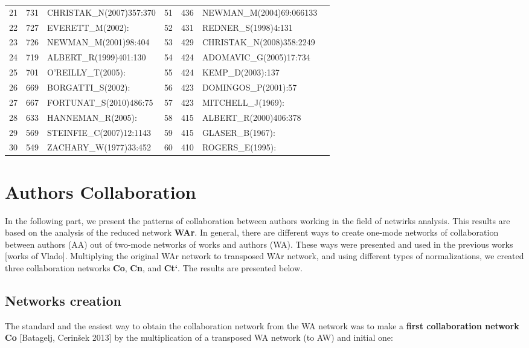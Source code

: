 \documentclass[11pt]{article} %
\begin{document}
\begin{table}
\begin{tabular}{c|c|l||c|c|l|l}
21&   	731&   	CHRISTAK\_N(2007)357:370&   	51&   	436&   	NEWMAN\_M(2004)69:066133\\
22&   	727&   	EVERETT\_M(2002):&   	52&   	431&   	REDNER\_S(1998)4:131\\
23&   	726&   	NEWMAN\_M(2001)98:404&   	53&   	429&   	CHRISTAK\_N(2008)358:2249\\
24&   	719&   	ALBERT\_R(1999)401:130&   	54&   	424&   	ADOMAVIC\_G(2005)17:734\\
25&   	701&   	O'REILLY\_T(2005):&   	55&   	424&   	KEMP\_D(2003):137\\
26&   	669&   	BORGATTI\_S(2002):&   	56&   	423&   	DOMINGOS\_P(2001):57\\
27&   	667&   	FORTUNAT\_S(2010)486:75&   	57&   	423&   	MITCHELL\_J(1969):\\
28&   	633&   	HANNEMAN\_R(2005):&   	58&   	415&   	ALBERT\_R(2000)406:378\\
29&   	569&   	STEINFIE\_C(2007)12:1143&   	59&   	415&   	GLASER\_B(1967):\\
30&   	549&   	ZACHARY\_W(1977)33:452&   	60&   	410&   	ROGERS\_E(1995):\\ \hline
\end{tabular}
\end{table}

\section{Authors Collaboration}  

In the following part, we present the patterns of collaboration between authors working in the field of netwirks analysis. This results are based on the analysis of the reduced network \textbf{WAr}. In general, there are different ways to create one-mode networks of collaboration between authors (AA) out of two-mode networks of works and authors (WA). These ways were presented and used in the previous works [works of Vlado]. Multiplying the original WAr network to transposed WAr network, and using different types of normalizations, we created three collaboration networks \textbf{Co}, \textbf{Cn}, and \textbf{Ct`}. The results are presented below. \medskip  

\subsection{Networks creation}  

The standard and the easiest way to obtain the collaboration network from the WA network was to make a \textbf{first collaboration network Co} [Batagelj, Cerinšek 2013] by the multiplication of a transposed WA network (to AW) and initial one: \medskip 
\end{document}
